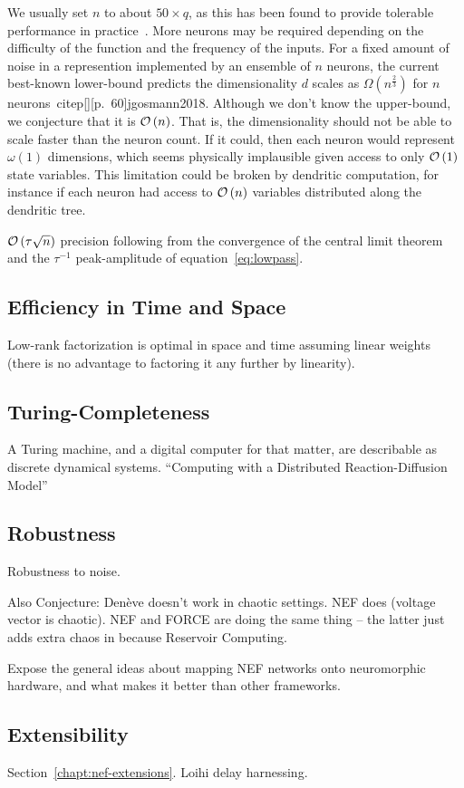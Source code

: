 We usually set $n$ to about $50 \times q$, as this has been found to provide tolerable performance in practice~\citep{braindrop2019}. 
More neurons may be required depending on the difficulty of the function and the frequency of the inputs.
For a fixed amount of noise in a represention implemented by an ensemble of $n$ neurons, the current best-known lower-bound predicts the dimensionality $d$ scales as $\Omega \left( n^{\frac{2}{3}} \right)$ for $n$ neurons~citep[][p.~60]{jgosmann2018}.
Although we don't know the upper-bound, we conjecture that it is $\mathcal{O}\left({n}\right)$.
That is, the dimensionality should not be able to scale faster than the neuron count.
If it could, then each neuron would represent $\omega(1)$ dimensions, which seems physically implausible given access to only $\mathcal{O}\left({1}\right)$ state variables.
This limitation could be broken by dendritic computation, for instance if each neuron had access to $\mathcal{O}\left({n}\right)$ variables distributed along the dendritic tree.

$\mathcal{O}\left({ \tau \sqrt{n} }\right)$ precision following from the convergence of the central limit theorem~\citep[CLT;][]{berry1941accuracy, esseen1942liapunov} and the $\tau^{-1}$ peak-amplitude of equation~\ref{eq:lowpass}.

\subsection{Efficiency in Time and Space}

Low-rank factorization is optimal in space and time assuming linear weights (there is no advantage to factoring it any further by linearity).

\subsection{Turing-Completeness}
\label{sec:nef-turing}

A Turing machine, and a digital computer for that matter, are describable as discrete dynamical systems.
``Computing with a Distributed Reaction-Diffusion Model''


\subsection{Robustness}
\label{sec:nef-robustness}

Robustness to noise.

Also Conjecture: Den\`eve doesn't work in chaotic settings. NEF does (voltage vector is chaotic). NEF and FORCE are doing the same thing -- the latter just adds extra chaos in because Reservoir Computing.



Expose the general ideas about mapping NEF networks onto neuromorphic hardware, and what makes it better than other frameworks.


\subsection{Extensibility}
\label{sec:nef-extensibility}

Section~\ref{chapt:nef-extensions}. Loihi delay harnessing.

